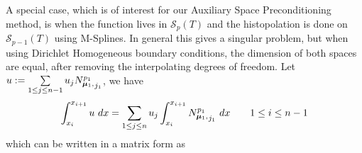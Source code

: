 \noindent
A special case, which is of interest for our Auxiliary Space Preconditioning method, is when the function lives in $\mathcal{S}_p(T)$ and the histopolation is done on $\mathcal{S}_{p-1}(T)$ using M-Splines. In general this gives a singular problem, but when using Dirichlet Homogeneous boundary conditions, the dimension of both spaces are equal, after removing the interpolating degrees of freedom. 
\noindent
Let $u := \sum\limits_{1 \le j \le n-1} u_j {N_{\boldsymbol{\mu}_1,}^{p_1}}_{j_1}$, we have
\begin{align}
  \int_{x_i}^{x_{i+1}} u ~dx = \sum\limits_{1 \le j \le n} u_j \int_{x_i}^{x_{i+1}} {N_{\boldsymbol{\mu}_1,}^{p_1}}_{j_1} ~dx \quad \quad 1 \leq i \leq n-1
\end{align}
which can be written in a matrix form as

